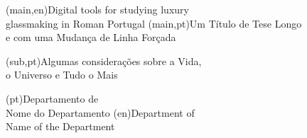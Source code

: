 
%


\nttitle(main,en){Digital tools for studying luxury\\glassmaking in Roman Portugal}%
\nttitle(main,pt){Um Título de Tese Longo\\e com uma Mudança de Linha Forçada}%

\nttitle(sub,pt){Algumas considerações sobre a Vida,\\o Universo e Tudo o Mais}%


\ntdepartment*(pt){Departamento de\\Nome do Departamento}
\ntdepartment*(en){Department of\\Name of the Department}


